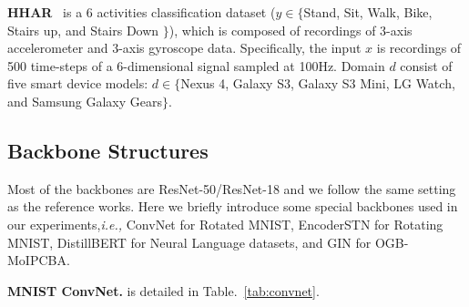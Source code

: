 \documentclass{article} \usepackage{iclr2023_conference,times}
\newcommand{\ie}[0]{\textit{i.e., }}
\begin{document}
\noindent\textbf{HHAR}~\citep{gagnon2022woods} is a 6 activities classification dataset ($y\in\{$Stand, Sit, Walk, Bike, Stairs up, and Stairs Down $\}$), which is composed of recordings of 3-axis accelerometer and 3-axis gyroscope data. Specifically, the input $x$ is recordings of 500 time-steps of a 6-dimensional signal sampled at 100Hz. Domain $d$ consist of five smart device models: $d\in\{$Nexus 4, Galaxy S3, Galaxy S3 Mini, LG Watch, and Samsung Galaxy Gears$\}$.  

\subsection{Backbone Structures}

Most of the backbones are ResNet-50/ResNet-18 and we follow the same setting as the reference works. Here we briefly introduce some special backbones used in our experiments,\ie ConvNet for Rotated MNIST, EncoderSTN for Rotating MNIST, DistillBERT for Neural Language datasets, and GIN for OGB-MoIPCBA.

\noindent\textbf{MNIST ConvNet.} is detailed in Table.~\ref{tab:convnet}. 
\end{document}
